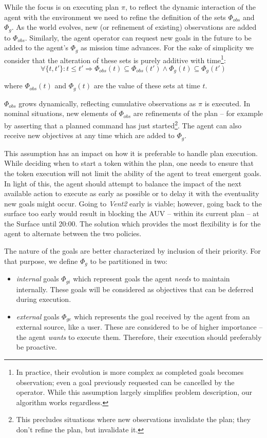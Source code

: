  
While the focus is on executing plan $\pi$, to reflect the dynamic
interaction of the agent with the environment we need to refine the
definition of the sets $\Phi_{obs}$ and $\Phi_g$. As the world
evolves, new (or refinement of existing) observations are added to
$\Phi_{obs}$. Similarly, the agent operator can request new goals in
the future to be added to the agent's $\Phi_g$ as mission time
advances. For the sake of simplicity we consider that the alteration
of these sets is purely additive with time\footnote{In practice, their
  evolution is more complex as completed goals becomes observation;
  even a goal previously requested can be cancelled by the
  operator. While this assumption largely simplifies problem
  description, our algorithm works regardless.}:
\[ \forall \{t, t'\}: t \le t' \Rightarrow \Phi_{obs}(t) \subseteq \Phi_{obs}(t')
\wedge \Phi_g(t) \subseteq \Phi_g(t') \] 

where $\Phi_{obs}(t)$ and $\Phi_g(t)$ are the value of these sets at
time $t$.

$\Phi_{obs}$ grows dynamically, reflecting cumulative observations as
$\pi$ is executed. In nominal situations, new elements of $\Phi_{obs}$
are refinements of the plan -- for example by asserting that a planned
command has just started\footnote{This precludes situations where new
  observations invalidate the plan; they don't refine the plan, but
  invalidate it.}. The agent can also receive new objectives at any
time which are added to $\Phi_g$. 

This assumption has an impact on how it is preferable to handle plan
execution. While deciding when to start a token within the plan, one
needs to ensure that the token execution will not limit the ability of the
agent to treat emergent goals. In light of this, the agent should
attempt to balance the impact of the next available action to execute
as early as possible or to delay it with the eventuality new goals
might occur. Going to \emph{Vent2} early is viable; however, going
back to the surface too early would result in blocking the AUV --
within its current plan -- at the Surface until 20:00. The solution
which provides the most flexibility is for the agent to alternate
between the two policies.

The nature of the goals are better characterized by inclusion of their
priority. For that purpose, we define $\Phi_g$ to be partitioned in two:

\begin{itemize}

\item \emph{internal} goals $\Phi_{gi}$ which represent goals the
  agent {\em needs} to maintain internally. These goals will be
  considered as objectives that can be deferred during execution.

\item \emph{external} goals $\Phi_{ge}$ which represents the goal
  received by the agent from an external source, like a user. These are
  considered to be of higher importance -- \ie the agent {\em wants}
  to execute them. Therefore, their execution should preferably be
  proactive.

\end{itemize}

